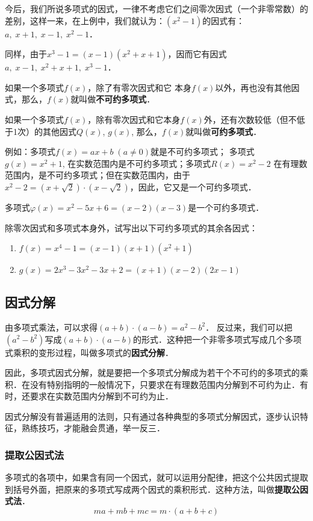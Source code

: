 今后，我们所说多项式的因式，一律不考虑它们之间零次因式（一个非零常数）的差别，这样一来，在上例中，我们就认为：$(x^2-1)$的因式有：$a,\; x+1,\; x-1,\; x^2-1$．

同样，由于$x^3-1=(x-1)(x^2+x+1)$，因而它有因式$a,\; x-1,\; x^2+x+1,\; x^3-1$．

如果一个多项式$f(x)$，除了有零次因式和它
本身$f(x)$以外，再也没有其他因式，那么，$f(x)$就叫做\textbf{不可约多项式}．

如果一个多项式$f(x)$，除有零次因式和它本身$f(x)$外，还有次数较低（但不低于1次）的其他因式$Q(x)$, $g(x)$, 那么，$f(x)$就叫做\textbf{可约多项式}．

例如：多项式$f(x)=ax+b\; (a\ne 0)$就是不可约多项式；
多项式$g(x)=x^2+1$, 在实数范围内是不可约多项式；多项式$R(x)=x^2-2$ 在有理数范围内，是不可约多项式；但在实数范围内，由于$x^2-2=(x+\sqrt{2})\cdot (x-\sqrt{2})$，因此，它又是一个可约多项式．

多项式$\varphi(x)=x^2-5x+6=(x-2)(x-3)$是一个可约多项式．

\begin{ex}
    除零次因式和多项式本身外，试写出以下可约多项式的其余各因式：
    \begin{enumerate}
        \item $f (x) =x^4-1= (x-1) (x+1)(x^2+1)$
        \item $g (x) =2x^3-3x^2-3x+2= (x+1) (x-2)(2x-1)$
    \end{enumerate} 
\end{ex}

\subsection{因式分解}
由多项式乘法，可以求得$(a+b)\cdot (a-b)=a^2-b^2$．
反过来，我们可以把$(a^2-b^2)$写成$(a+b)\cdot (a-b)$的形式．这种把一个非零多项式写成几个多项式乘积的变形过程，叫做多项式的\textbf{因式分解}．

因此，多项式因式分解，就是要把一个多项式分解成为若干个不可约的多项式的乘积．在没有特别指明的一般情况下，只要求在有理数范围内分解到不可约为止．有时，还要求在实数范围内分解到不可约为止．

因式分解没有普遍适用的法则，只有通过各种典型的多项式分解因式，逐步认识特征，熟练技巧，才能融会贯通，举一反三．

\subsubsection{提取公因式法}
多项式的各项中，如果含有同一个因式，就可以运用分配律，把这个公共因式提取到括号外面，把原来的多项式写成两个因式的乘积形式．这种方法，叫做\textbf{提取公因式法}．
\[ma+mb+mc=m\cdot (a+b+c)\]


